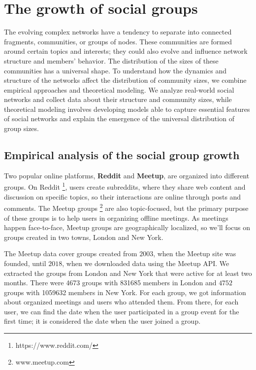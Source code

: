 \chapter{The growth of social groups}
\label{Ch:Groups}

The evolving complex networks have a tendency to separate into connected fragments, communities, or groups of nodes. These communities are formed around certain topics and interests; they could also evolve and influence network structure and members' behavior. The distribution of the sizes of these communities has a universal shape. To understand how the dynamics and structure of the networks affect the distribution of community sizes, we combine empirical approaches and theoretical modeling. We analyze real-world social networks and collect data about their structure and community sizes, while theoretical modeling involves developing models able to capture essential features of social networks and explain the emergence of the universal distribution of group sizes.

\section{Empirical analysis of the social group growth}

Two popular online platforms, \textbf{Reddit} and \textbf{Meetup}, are organized into different groups. On Reddit \footnote{https://www.reddit.com/}, users create subreddits, where they share web content and discussion on specific topics, so their interactions are online through posts and comments. The Meetup groups \footnote{www.meetup.com} are also topic-focused, but the primary purpose of these groups is to help users in organizing offline meetings. As meetings happen face-to-face, Meetup groups are geographically localized, so we'll focus on groups created in two towns, London and New York.  

The Meetup data cover groups created from $2003$, when the Meetup site was founded, until $2018$, when we downloaded data using the Meetup API. We extracted the groups from London and New York that were active for at least two months. There were 4673 groups with 831685 members in London and $4752$ groups with 1059632 members in New York. For each group, we got information about organized meetings and users who attended them. From there, for each user, we can find the date when the user participated in a group event for the first time; it is considered the date when the user joined a group. 

